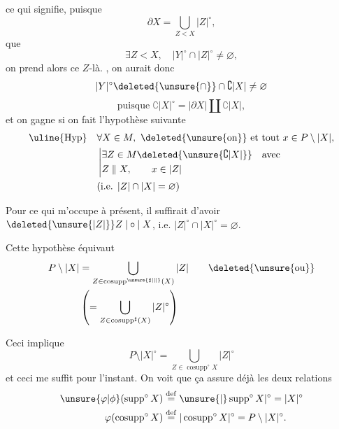ce qui signifie, puisque
\[
\partial X=\bigcup_{Z<X}|Z|^{\circ},
\]
que
\[
\exists Z<X,\quad |Y|^{\circ}\cap|Z|^{\circ}\neq\varnothing,
\]
on prend alors ce $Z$-là. , on aurait donc
\[
|Y|^{\circ}\deleted{\unsure{\cap}}\cap\complement|X|\neq\varnothing
\]
\[
\text{puisque }\complement|X|^{\circ}=|\partial X|\amalg\complement|X|,
\]
et on gagne si on fait l'hypothèse suivante
\[
\begin{aligned}
\text{\uline{Hyp}}\quad&\forall X\in M,\ \deleted{\text{\unsure{on}}}\text{ et tout }x\in P\setminus|X|,\\
&\left|\begin{aligned}
&\exists Z\in M\deleted{\unsure{\complement|X|}}\quad\text{avec}\\
&Z\parallel X,\qquad x\in|Z|
\end{aligned}\right.\\
&\text{(i.e. }|Z|\cap|X|=\varnothing\text{)}
\end{aligned}
\]

Pour ce qui m'occupe à présent, il suffirait d'avoir $\deleted{\unsure{|Z|}}Z\mathrel{|\circ|}X$, i.e. $|Z|^{\circ}\cap|X|^{\circ}=\varnothing$.

Cette hypothèse équivaut 
\[
\begin{aligned}
P\setminus|X|&=\bigcup_{Z\in\operatorname{cosupp}^{\unsure{\sharp|\parallel}}(X)}|Z|\qquad\deleted{\unsure{\text{ou}}}\\
&\left(=\bigcup_{Z\in\operatorname{cosupp}^{\sharp}(X)}|Z|^{\circ}\right)
\end{aligned}
\]
\clearpage
{}

Ceci implique
\[
P\setminus|X|^{\circ}=\bigcup_{Z\in\operatorname{cosupp}^{\circ}X}|Z|^{\circ}
\]
et ceci me suffit pour l'instant. On voit que ça assure déjà les deux relations
\[
\begin{aligned}
\unsure{\varphi|\phi}(\operatorname{supp}^{\circ}X)&\overset{\mathrm{def}}{=}\unsure{\lvert}\operatorname{supp}^{\circ}X|^{\circ}=|X|^{\circ}\\
\varphi(\operatorname{cosupp}^{\circ}X)&\overset{\mathrm{def}}{=}|\operatorname{cosupp}^{\circ}X|^{\circ}=P\setminus|X|^{\circ}.
\end{aligned}
\]

